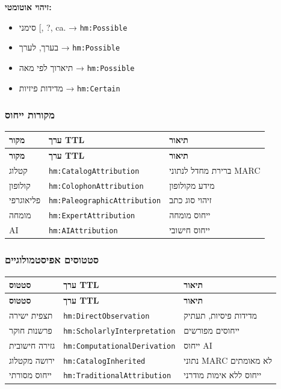 \documentclass[12pt,a4paper]{article}
\newcommand{\ttlprop}[1]{\texttt{#1}}
\begin{document}
\textbf{זיהוי אוטומטי:}
\begin{itemize}
\item סימני [, ?, ca. → \ttlprop{hm:Possible}
\item בערך, לערך → \ttlprop{hm:Possible}
\item תיארוך לפי מאה → \ttlprop{hm:Possible}
\item מדידות פיזיות → \ttlprop{hm:Certain}
\end{itemize}

\subsubsection{מקורות ייחוס}

\begin{longtable}{|p{4cm}|L{5cm}|L{7cm}|}
\hline
\textbf{מקור} & \textbf{ערך TTL} & \textbf{תיאור} \\
\hline
\endfirsthead
\hline
\textbf{מקור} & \textbf{ערך TTL} & \textbf{תיאור} \\
\hline
\endhead
\hline
\endfoot
קטלוג & \ttlprop{hm:CatalogAttribution} & ברירת מחדל לנתוני MARC \\
\hline
קולופון & \ttlprop{hm:ColophonAttribution} & מידע מקולופון \\
\hline
פליאוגרפי & \ttlprop{hm:PaleographicAttribution} & זיהוי סוג כתב \\
\hline
מומחה & \ttlprop{hm:ExpertAttribution} & ייחוס מומחה \\
\hline
AI & \ttlprop{hm:AIAttribution} & ייחוס חישובי \\
\hline
\end{longtable}

\subsubsection{סטטוסים אפיסטמולוגיים}

\begin{longtable}{|p{4cm}|L{5cm}|L{7cm}|}
\hline
\textbf{סטטוס} & \textbf{ערך TTL} & \textbf{תיאור} \\
\hline
\endfirsthead
\hline
\textbf{סטטוס} & \textbf{ערך TTL} & \textbf{תיאור} \\
\hline
\endhead
\hline
\endfoot
תצפית ישירה & \ttlprop{hm:DirectObservation} & מדידות פיסיות, תעתיק \\
\hline
פרשנות חוקר & \ttlprop{hm:ScholarlyInterpretation} & ייחוסים מפורשים \\
\hline
גזירה חישובית & \ttlprop{hm:ComputationalDerivation} & ייחוס AI \\
\hline
ירושה מקטלוג & \ttlprop{hm:CatalogInherited} & נתוני MARC לא מאומתים \\
\hline
ייחוס מסורתי & \ttlprop{hm:TraditionalAttribution} & ייחוס ללא אימות מודרני \\
\hline
\end{longtable}
\end{document}
